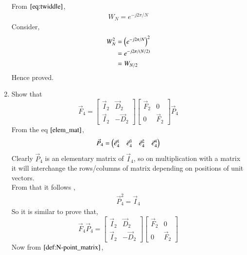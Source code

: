 \documentclass[journal,12pt,twocolumn]{IEEEtran}
\renewcommand\thesection{\arabic{section}}
\begin{document}
\begin{enumerate}[label=\arabic*.,ref=\thesection.\theenumi]
    \solution 
      From $\eqref{eq:twiddle}$,
        \begin{align}
          W_{N} = e^{-j2\pi/N}
        \end{align}
      Consider,
        \begin{align}
          W_{N}^{2} &= \left(e^{-j2\pi/N}\right)^2 \\
              &= e^{-j2\pi/\left(N/2\right)} \\
              &= W_{N/2}\label{result}
        \end{align}
    Hence proved.\\
      \item Show that 
    \begin{equation}
      \vec{F}_{4}=
    \begin{bmatrix}
      \vec{I}_{2} & \vec{D}_{2} \\
    \vec{I}_{2} & -\vec{D}_{2}
    \end{bmatrix}
    \begin{bmatrix}
    \vec{F}_{2} & 0 \\
    0 & \vec{F}_{2}
    \end{bmatrix}
      \vec{P}_{4}
    \end{equation}
      \solution From the eq $\eqref{elem_mat}$,
        \begin{align}
                      \vec{P}_4 = \begin{pmatrix}\vec{e}_4^{1} &\vec{e}_4^{3} &\vec{e}_4^{2} &\vec{e}_4^{4} \end{pmatrix}
                    \end{align}
    Clearly $\vec{P}_4$ is an elementary matrix of $\vec{I}_{4}$, so on multiplication with a matrix it will interchange the rows/columns of matrix depending on positions of unit vectors.\\
    From that it follows ,
        \begin{align}
          \vec{P}_4^2 = \vec{I}_4
        \end{align}
    So it is similar to prove that, 
      \begin{equation} 
        \vec{F}_{4}\vec{P}_{4}=
    \begin{bmatrix}
            \vec{I}_{2} & \vec{D}_{2} \\
    \vec{I}_{2} & -\vec{D}_{2}
    \end{bmatrix}
    \begin{bmatrix}
    \vec{F}_{2} & 0 \\
    0 & \vec{F}_{2}   
    \end{bmatrix}                    
    \end{equation}
     Now from $\eqref{def:N-point_matrix}$,

\end{enumerate}
\end{document}
